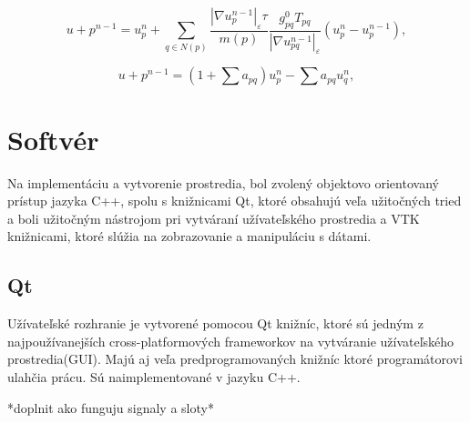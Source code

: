\documentclass[a4paper,11pt,twoside]{article}%
\def\epsilon{\varepsilon}
\begin{document}
\begin{equation}
u+p^{n-1} = u_p^n + \sum_{q \in N(p)}\frac{|\nabla u_p^{n-1}|_{\epsilon}\tau}{m(p)} \frac{g_{pq}^0T_{pq}}{|\nabla u_{pq}^{n-1}|_{\epsilon}} (u_p^n-u_p^{n-1}),
\end{equation}

\begin{equation}
u+p^{n-1} = (1 + \sum a_{pq})u_p^n -  \sum a_{pq}u_q^n,
\end{equation}



\section{Softvér}

Na implementáciu a vytvorenie prostredia, bol zvolený objektovo orientovaný prístup jazyka C++, spolu s knižnicami Qt, ktoré obsahujú veľa užitočných tried a boli užitočným nástrojom pri vytváraní užívateľského prostredia a VTK knižnicami, ktoré slúžia na zobrazovanie a manipuláciu s dátami.

\subsection{Qt}
Užívateľské rozhranie je vytvorené pomocou Qt knižníc, ktoré sú jedným z najpoužívanejších cross-platformových frameworkov na vytváranie užívateľského prostredia(GUI). Majú aj veľa predprogramovaných knižníc ktoré programátorovi ulahčia prácu. Sú naimplementované v jazyku C++. 

*doplnit ako funguju signaly a sloty*
\end{document}
